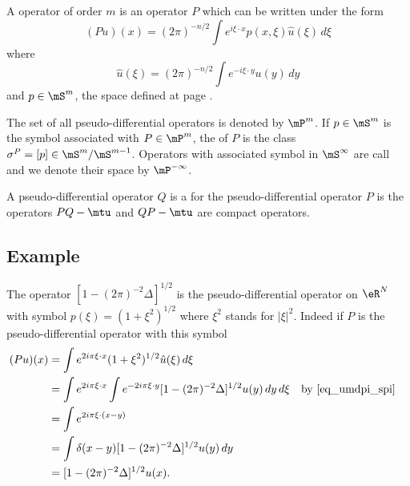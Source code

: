 \begin{definition}
	A  operator of order $m$ is an operator $P$ which can be written under the form
	\begin{equation}
		(Pu)(x)=(2\pi)^{-n/2}\int e^{i\xi\cdot x}p(x,\xi)\hat u(\xi)\,d\xi
	\end{equation}
	where
	\begin{equation}
		\hat u(\xi)=(2\pi)^{-n/2}\int e^{-i\xi\cdot y}u(y)\,dy
	\end{equation}
	and $p\in\mS^m$, the space defined at page \pageref{pg:defmS}.
\end{definition}

The set of all pseudo-differential operators is denoted by $\mP^m$. If $p\in\mS^m$ is the symbol associated with $P\in\mP^m$, the  of $P$ is the class $\sigma^P=[p]\in\mS^m/\mS^{m-1}$. Operators with associated symbol in $\mS^{\-\infty}$ are call  and we denote their space by $\mP^{-\infty}$.

A pseudo-differential operator $Q$ is a  for the pseudo-differential operator $P$ is the operators $PQ-\mtu$ and $QP-\mtu$ are compact operators.


\subsection{Example} \label{pg_exem_psdo}

The operator $[1-(2\pi)^{-2}\Delta]^{1/2}$ is the pseudo-differential operator on $\eR^N$ with symbol $p(\xi)=(1+\xi^2)^{1/2}$ where $\xi^2$ stands for $| \xi |^2$. Indeed if $P$ is the pseudo-differential operator with this symbol
\[
	\begin{aligned}
		(Pu)(x) & =\int e^{2i\pi\xi\cdot x} (1+\xi^2)^{1/2}\hat u(\xi)\,d\xi                                                                      \\
		        & =\int e^{2i\pi\xi\cdot x}\int e^{-2i\pi\xi\cdot y}[1-(2\pi)^{-2}\Delta]^{1/2}u(y)\,dy\,d\xi &  & \text{by \eqref{eq_umdpi_spi}} \\
		        & =\int e^{2i\pi\xi\cdot(x-y)}                                                                                                    \\
		        & =\int\delta(x-y)[1-(2\pi)^{-2}\Delta]^{1/2}u(y)\,dy                                                                             \\
		        & =[1-(2\pi)^{-2}\Delta]^{1/2}u(x).
	\end{aligned}
\]

